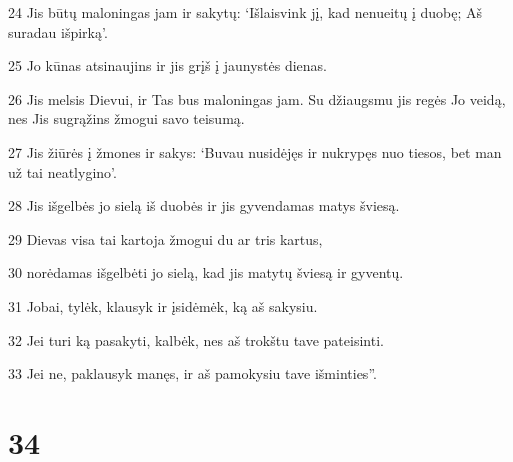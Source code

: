 \par 24 Jis būtų maloningas jam ir sakytų: ‘Išlaisvink jį, kad nenueitų į duobę; Aš suradau išpirką’. 
\par 25 Jo kūnas atsinaujins ir jis grįš į jaunystės dienas. 
\par 26 Jis melsis Dievui, ir Tas bus maloningas jam. Su džiaugsmu jis regės Jo veidą, nes Jis sugrąžins žmogui savo teisumą. 
\par 27 Jis žiūrės į žmones ir sakys: ‘Buvau nusidėjęs ir nukrypęs nuo tiesos, bet man už tai neatlygino’. 
\par 28 Jis išgelbės jo sielą iš duobės ir jis gyvendamas matys šviesą. 
\par 29 Dievas visa tai kartoja žmogui du ar tris kartus, 
\par 30 norėdamas išgelbėti jo sielą, kad jis matytų šviesą ir gyventų. 
\par 31 Jobai, tylėk, klausyk ir įsidėmėk, ką aš sakysiu. 
\par 32 Jei turi ką pasakyti, kalbėk, nes aš trokštu tave pateisinti. 
\par 33 Jei ne, paklausyk manęs, ir aš pamokysiu tave išminties”.



\chapter{34}


